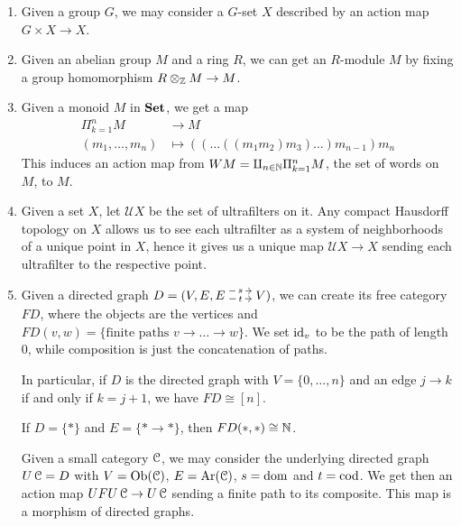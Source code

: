 \documentclass[a4paper,11pt,oneside,openany]{scrbook}
\begin{document}
\begin{exmp}
	\begin{enumerate}
		\item Given a group $G$, we may consider a $G$-set $X$ described by an action map $G\times X\rightarrow X$.
		\item Given an abelian group $M$ and a ring $R$, we can get an $R$-module $M$ by fixing a group homomorphism $R\otimes_{\operatorname{\mathbb{Z}}} M\rightarrow M$.
		\item Given a monoid $M$ in ${\normalfont\textbf{Set}}$, we get a map
            \begin{align*}
                \Pi_{k=1}^n M &\rightarrow M \\
                (m_1,\ldots,m_n) &\mapsto ((\ldots ((m_1m_2)m_3)\ldots )m_{n-1})
                m_n
            \end{align*}
            This induces an action map from $WM=\amalg_{n\in\operatorname{\mathbb{N}}}\Pi_{k=1}^n M$, the set of words on $M$, to $M$.
		\item\label{ultrafilters}
		      Given a set $X$, let $\mathcal{U}X$ be the set of ultrafilters on it. Any compact Hausdorff topology on $X$ allows us to see each ultrafilter as a system of neighborhoods of a unique point in $X$, hence it gives us a unique map $\mathcal{U}X\rightarrow X$ sending each ultrafilter to the respective point.
		\item Given a directed graph $D=(V,E,\hspace{-1.5mm}\begin{tikzcd}
				      E\hspace{-1.5mm}\arrow[r, "t" description,  shift right=.5ex, shorten <= .3em, shorten >= .3em]  \arrow[r, "s" description, shift left=1ex, shorten <= .3em, shorten >= .3em] & \hspace{-1.5mm}V
			      \end{tikzcd}\hspace{-1.5mm})$, we can create its free category $FD$, where the objects are the vertices and $FD(v,w)=\{\text{finite paths } v\rightarrow\ldots\rightarrow w\}$. We set $\operatorname{id}_v$ to be the path of length 0, while composition is just the concatenation of paths.

		      In particular, if $D$ is the directed graph with $V=\{0,\ldots,n\}$ and an edge $j\rightarrow k$ if and only if $k=j+1$, we have $FD\cong [n]$.

		      If $D=\{*\}$ and $E=\{*\rightarrow *\}$, then $FD(*,*)\cong\operatorname{\mathbb{N}}$.

		      Given a small category $\operatorname{\mathcal{C}}$, we may consider the underlying
		      directed graph $U\operatorname{\mathcal{C}}=D$
		      with $V=\operatorname{Ob}(\operatorname{\mathcal{C}})$, $E=\operatorname{Ar}(\operatorname{\mathcal{C}})$, $s=\operatorname{dom}$ and $t=\operatorname{cod}$. We get then an
		      action map $UFU\operatorname{\mathcal{C}}\rightarrow U\operatorname{\mathcal{C}}$ sending a finite path to its
		      composite. This map is a morphism of directed graphs.
	\end{enumerate}
\end{exmp}
\end{document}
